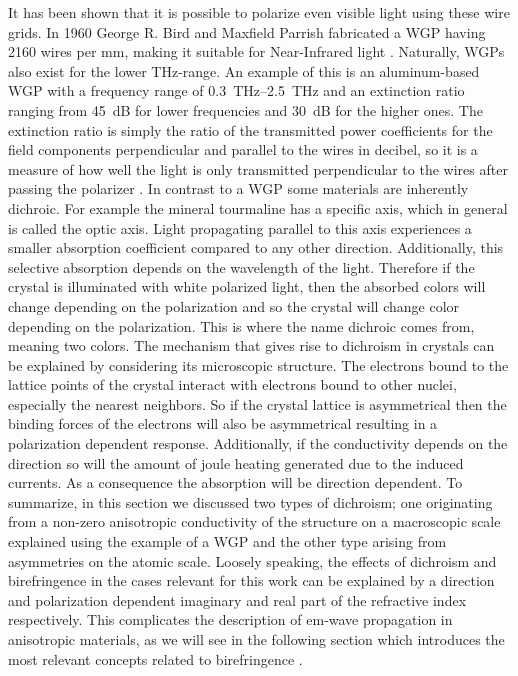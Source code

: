 It has been shown that it is possible to polarize even visible light using these wire grids. In 1960 George R. Bird and Maxfield Parrish fabricated a WGP having 2160 wires per mm, making it suitable for Near-Infrared light \cite{Bird1960ThePolarizer}. Naturally, WGPs also exist for the lower THz-range. An example of this is an aluminum-based WGP with a frequency range of \SIrange{0.3}{2.5}{\tera \hertz} and an extinction ratio ranging from \SI{45}{\dB} for lower frequencies and \SI{30}{\dB} for the higher ones. The extinction ratio is simply the ratio of the transmitted power coefficients for the field components perpendicular and parallel to the wires in decibel, so it is a measure of how well the light is only transmitted perpendicular to the wires after passing the polarizer \cite{Ferraro2016FlexibleLoss}. 
In contrast to a WGP some materials are inherently dichroic. For example the mineral tourmaline has a specific axis, which in general is called the optic axis. Light propagating parallel to this axis experiences a smaller absorption coefficient compared to any other direction. Additionally, this selective absorption depends on the wavelength of the light. Therefore if the crystal is illuminated with white polarized light, then the absorbed colors will change depending on the polarization and so the crystal will change color depending on the polarization. This is where the name dichroic comes from, meaning two colors. The mechanism that gives rise to dichroism in crystals can be explained by considering its microscopic structure. The electrons bound to the lattice points of the crystal interact with electrons bound to other nuclei, especially the nearest neighbors. So if the crystal lattice is asymmetrical then the binding forces of the electrons will also be asymmetrical resulting in a polarization dependent response. Additionally, if the conductivity depends on the direction so will the amount of joule heating generated due to the induced currents. As a consequence the absorption will be direction dependent. To summarize, in this section we discussed two types of dichroism; one originating from a non-zero anisotropic conductivity of the structure on a macroscopic scale explained using the example of a WGP and the other type arising from asymmetries on the atomic scale. Loosely speaking, the effects of dichroism and birefringence in the cases relevant for this work can be explained by a direction and polarization dependent imaginary and real part of the refractive index respectively. This complicates the description of em-wave propagation in anisotropic materials, as we will see in the following section which introduces the most relevant concepts related to birefringence \cite{HechtOpticsEdition}.

